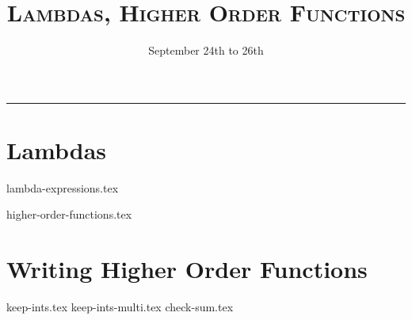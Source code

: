 \documentclass{exam}
\title{\textsc{Lambdas, Higher Order Functions}}
\date{September 24th to 26th}
\begin{document}
\maketitle
\rule{\textwidth}{0.15em}
\fontsize{12}{15}\selectfont


\section{Lambdas}
{lambda-expressions.tex}
\newpage
\begin{questions}
{higher-order-functions.tex}
\end{questions}
\newpage
\section{Writing Higher Order Functions}
\begin{questions}
{keep-ints.tex}
{keep-ints-multi.tex}
{check-sum.tex}

\end{questions}
\end{document}
